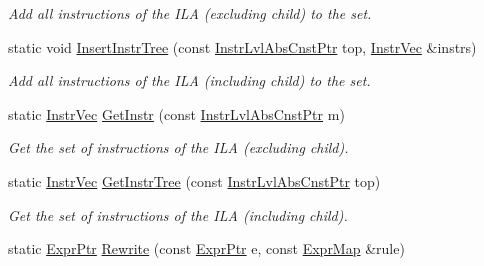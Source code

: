 \begin{DoxyCompactItemize}
\begin{DoxyCompactList}\small\item\em Add all instructions of the I\+LA (excluding child) to the set. \end{DoxyCompactList}\item 
\mbox{\label{classilang_1_1_abs_knob_a040f9d9352f862310612ed3893a13ca0}} 
static void \mbox{\hyperlink{classilang_1_1_abs_knob_a040f9d9352f862310612ed3893a13ca0}{Insert\+Instr\+Tree}} (const \mbox{\hyperlink{namespaceilang_adc86156b73aa1a4b6369645e9b96ff19}{Instr\+Lvl\+Abs\+Cnst\+Ptr}} top, \mbox{\hyperlink{namespaceilang_a35e6555f156373812f16030b98c42e65}{Instr\+Vec}} \&instrs)
\begin{DoxyCompactList}\small\item\em Add all instructions of the I\+LA (including child) to the set. \end{DoxyCompactList}\item 
\mbox{\label{classilang_1_1_abs_knob_ae8cde935f9128e0ca4bf18649b8d76ca}} 
static \mbox{\hyperlink{namespaceilang_a35e6555f156373812f16030b98c42e65}{Instr\+Vec}} \mbox{\hyperlink{classilang_1_1_abs_knob_ae8cde935f9128e0ca4bf18649b8d76ca}{Get\+Instr}} (const \mbox{\hyperlink{namespaceilang_adc86156b73aa1a4b6369645e9b96ff19}{Instr\+Lvl\+Abs\+Cnst\+Ptr}} m)
\begin{DoxyCompactList}\small\item\em Get the set of instructions of the I\+LA (excluding child). \end{DoxyCompactList}\item 
\mbox{\label{classilang_1_1_abs_knob_a43c249cc26f0374bd3991c335a1c0c9f}} 
static \mbox{\hyperlink{namespaceilang_a35e6555f156373812f16030b98c42e65}{Instr\+Vec}} \mbox{\hyperlink{classilang_1_1_abs_knob_a43c249cc26f0374bd3991c335a1c0c9f}{Get\+Instr\+Tree}} (const \mbox{\hyperlink{namespaceilang_adc86156b73aa1a4b6369645e9b96ff19}{Instr\+Lvl\+Abs\+Cnst\+Ptr}} top)
\begin{DoxyCompactList}\small\item\em Get the set of instructions of the I\+LA (including child). \end{DoxyCompactList}\item 
static \mbox{\hyperlink{namespaceilang_a7c4196c72e53ea4df4b7861af7bc3bce}{Expr\+Ptr}} \mbox{\hyperlink{classilang_1_1_abs_knob_a6668c30b9010fe929b24fcadb9232493}{Rewrite}} (const \mbox{\hyperlink{namespaceilang_a7c4196c72e53ea4df4b7861af7bc3bce}{Expr\+Ptr}} e, const \mbox{\hyperlink{namespaceilang_ad40e6475e04844bcad9c380aac0b215c}{Expr\+Map}} \&rule)

\end{DoxyCompactItemize}
